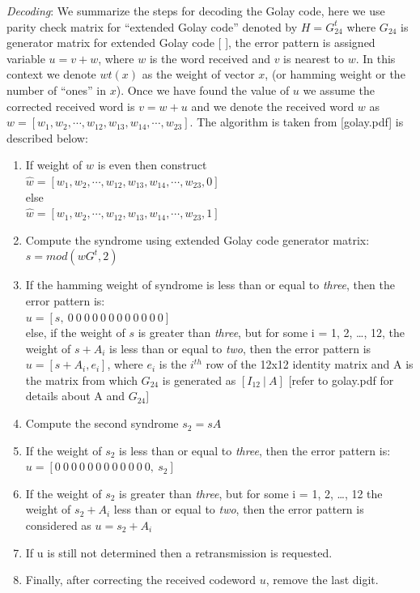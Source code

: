 \emph{Decoding}: We summarize the steps for decoding the Golay code, here we use parity check matrix for ``extended Golay code'' denoted by $H = G^t_{24}$ where $G_{24}$ is generator matrix for extended Golay code [ ], the error pattern is assigned variable $u = v + w$, where $w$ is the word received and $v$ is nearest to $w$. In this context we denote $wt(x)$ as the weight of vector $x$, (or hamming weight or the number of ``ones'' in $x$). Once we have found the value of $u$ we assume the
corrected received word is $v = w + u$ and we denote the received word $w$ as $w = [w_1, w_2, \cdots , w_{12}, w_{13}, w_{14}, \cdots , w_{23}]$. The algorithm is taken from [golay.pdf] is described below:
\begin{enumerate}
	\item If weight of $w$ is even then construct\\
		\tab $\hat{w} = [ w_1, w_2, \cdots , w_{12}, w_{13}, w_{14}, \cdots , w_{23}, 0]$\\
		  else\\
		\tab $\hat{w} = [ w_1, w_2, \cdots , w_{12}, w_{13}, w_{14}, \cdots , w_{23}, 1]$\\
	\item Compute the syndrome using extended Golay code generator matrix:\\
		\tab \tab \tab \tab $s = mod(wG^t, 2)$
	\item If the hamming weight of syndrome is less than or equal to \emph{three}, then the error pattern is:\\
		\tab \tab \tab $u = [s,\  0\  0\  0\  0\  0\  0\  0\  0\  0\  0\  0\  0]$\\
		else, if the weight of $s$ is greater than \emph{three}, but for some i = 1, 2, \ldots, 12, the weight of $s + A_i$ is less than or equal to \emph{two}, then the error pattern is $u = [ s + A_i, e_i]$, where $e_i$ is the $i^{th}$ row of the 12x12 identity matrix and A is the matrix from which $G_{24}$ is generated as $[I_{12}\:|\:A]$ [refer to golay.pdf for details about A and $G_{24}$]
	\item Compute the second  syndrome $s_2 = s A$
	\item If the weight of $s_2$ is less than or equal to \emph{three}, then the error pattern is:\\
		\tab \tab \tab $u = [ 0\  0\  0\  0\  0\  0\  0\  0\  0\  0\  0\  0,\ s_2]$
	\item If the weight of $s_2$ is greater than \emph{three}, but for some i = 1, 2, \ldots, 12 the weight of $s_2 + A_i$ less than or equal to \emph{two}, then the error pattern is considered as $u = s_2 + A_i$
	\item If u is still not determined then a retransmission is requested.

	\item Finally, after correcting the received codeword $u$, remove the last digit.
\end{enumerate}

